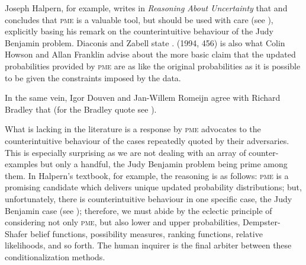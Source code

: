 \documentclass[phd,12pt,oneside]{ubcthesis}
\begin{document}
Joseph Halpern, for example, writes in \emph{Reasoning About
  Uncertainty} that   and
concludes that \textsc{pme} is a valuable tool, but should be used
with care (see ), explicitly basing his
remark on the counterintuitive behaviour of the Judy Benjamin problem.
Diaconis and Zabell state 
.  (1994,
456) is also what Colin Howson and Allan Franklin advise about
the more basic claim that the updated probabilities provided by
\textsc{pme} are as like the original probabilities as it is
possible to be given the constraints imposed by the data.

In the same vein, Igor Douven and Jan-Willem Romeijn agree with
Richard Bradley that  
(for the Bradley quote see ).

What is lacking in the literature is a response by \textsc{pme}
advocates to the counterintuitive behaviour of the cases repeatedly
quoted by their adversaries. This is especially surprising as we are
not dealing with an array of counter-examples but only a handful, the
Judy Benjamin problem being prime among them. In Halpern's textbook,
for example, the reasoning is as follows: \textsc{pme} is a
promising candidate which delivers unique updated probability
distributions; but, unfortunately, there is counterintuitive behaviour
in one specific case, the Judy Benjamin case (see
); therefore, we must abide by the
eclectic principle of considering not only \textsc{pme}, but also
lower and upper probabilities, Dempster-Shafer belief functions,
possibility measures, ranking functions, relative likelihoods, and so
forth. The human inquirer is the final arbiter between these
conditionalization methods.
\end{document}
